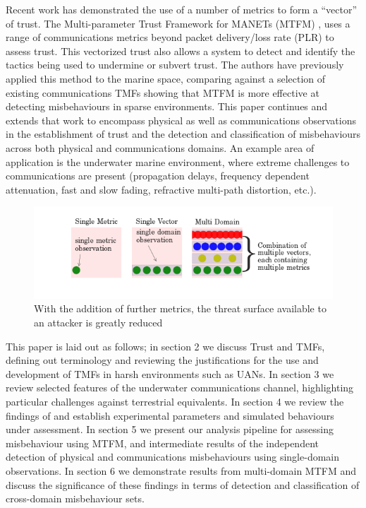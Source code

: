 \documentclass{aamas2016}
\begin{document}
Recent work has demonstrated the use of a number of metrics to form a ``vector'' of trust. The Multi-parameter Trust Framework for MANETs (MTFM) \cite{Guo11}, uses a range of communications metrics beyond packet delivery/loss rate (PLR) to assess trust. This vectorized trust also allows a system to detect and identify the tactics being used to undermine or subvert trust. The authors have previously applied this method to the marine space, comparing against a selection of existing communications TMFs \cite{Bolster2015} showing that MTFM is more effective at detecting misbehaviours in sparse environments. This paper continues and extends that work to encompass physical as well as communications observations in the establishment of trust and the detection and classification of misbehaviours across both physical and communications domains. 
An example area of application is the underwater marine environment, where extreme challenges to communications are present (propagation delays, frequency dependent attenuation, fast and slow fading, refractive multi-path distortion, etc.).
\begin{figure}[h!]
	\centering
	\includegraphics[width=0.9\linewidth]{threat_surface_sum}
	
	\caption{With the addition of further metrics, the threat surface available to an attacker is greatly reduced}
\end{figure}

This paper is laid out as follows; in section 2 we discuss Trust and TMFs, defining out terminology and reviewing the justifications for the use and development of TMFs in harsh environments such as UANs.
In section 3 we review selected features of the underwater communications channel, highlighting particular challenges against terrestrial equivalents. 
In section 4 we review the findings of \cite{Bolster2015} and establish experimental parameters and simulated behaviours under assessment. 
In section 5 we present our analysis pipeline for assessing misbehaviour using MTFM, and intermediate results of the independent detection of physical and communications misbehaviours using single-domain observations. 
In section 6 we demonstrate results from multi-domain MTFM and discuss the significance of these findings in terms of detection and classification of cross-domain misbehaviour sets.
\end{document}
